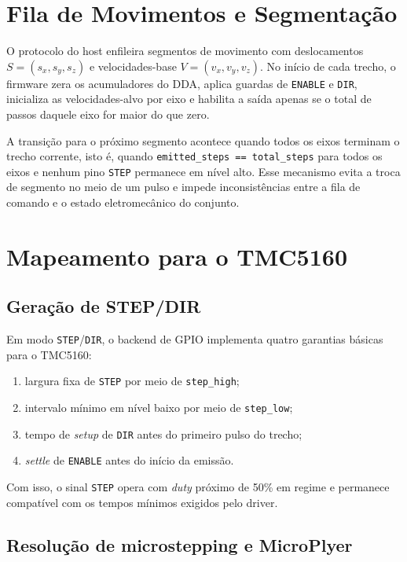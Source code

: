 \section{Fila de Movimentos e Segmenta\c{c}\~ao}
\label{sec:fila_segmentacao}

O protocolo do host enfileira segmentos de movimento com deslocamentos
$S=(s_x, s_y, s_z)$ e velocidades-base
$V=(v_x, v_y, v_z)$. No in\'icio de cada trecho, o firmware zera os
acumuladores do DDA, aplica guardas de \texttt{ENABLE} e \texttt{DIR},
inicializa as velocidades-alvo por eixo e habilita a sa\'ida apenas se o
total de passos daquele eixo for maior do que zero.

A transi\c{c}\~ao para o pr\'oximo segmento acontece quando todos os
eixos terminam o trecho corrente, isto \'e, quando
\texttt{emitted\_steps == total\_steps} para todos os eixos e nenhum
pino \texttt{STEP} permanece em n\'ivel alto. Esse mecanismo evita a
troca de segmento no meio de um pulso e impede inconsist\^encias entre a
fila de comando e o estado eletromec\^anico do conjunto.

\section{Mapeamento para o TMC5160}
\label{sec:mapeamento_tmc5160}

\subsection{Gera\c{c}\~ao de STEP/DIR}

Em modo \texttt{STEP}/\texttt{DIR}, o backend de GPIO implementa quatro
garantias b\'asicas para o TMC5160:
\begin{enumerate}
\item largura fixa de \texttt{STEP} por meio de \texttt{step\_high};
\item intervalo m\'inimo em n\'ivel baixo por meio de \texttt{step\_low};
\item tempo de \emph{setup} de \texttt{DIR} antes do primeiro pulso do
  trecho;
\item \emph{settle} de \texttt{ENABLE} antes do in\'icio da emiss\~ao.
\end{enumerate}
Com isso, o sinal \texttt{STEP} opera com \emph{duty} pr\'oximo de 50\%
em regime e permanece compat\'ivel com os tempos m\'inimos exigidos pelo
driver.

\subsection{Resolu\c{c}\~ao de microstepping e MicroPlyer}

